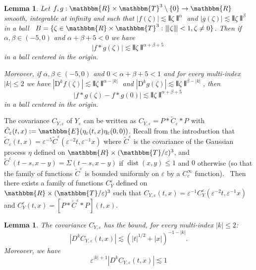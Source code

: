 \documentclass[a4paper,11pt]{article}
\newcommand{\assign}{:=}
\newcommand{\mathD}{\mathrm{D}}
\newcommand{\tmop}[1]{\ensuremath{\operatorname{#1}}}
\newtheorem{lemma}[theorem]{Lemma}
{\theorembodyfont{\rmfamily}\newtheorem{remark}[theorem]{Remark}}
\begin{document}
\begin{lemma}
  \label{l:hom-conv}Let $f, g : \mathbbm{R} \times \mathbbm{T}^3 \setminus
  \{0\} \rightarrow \mathbbm{R}$ smooth, integrable at infinity and such that
  $|f (\zeta) | \lesssim \interleave \zeta \interleave^{\alpha}$ and $|g
  (\zeta) | \lesssim \interleave \zeta \interleave^{\beta}$ in a ball \ $B =
  \{\zeta \in \mathbbm{R} \times \mathbbm{T}^3 : \interleave \zeta \interleave
  < 1, \zeta \neq 0\}$. Then if $\alpha, \beta \in (- 5, 0)$ and $\alpha +
  \beta + 5 < 0$ we have
  \[ |f \ast g (\zeta) | \lesssim \interleave \zeta \interleave^{\alpha +
     \beta + 5} \]
  in a ball centered in the origin.
  
  Moreover, if $\alpha, \beta \in (- 5, 0)$ and $0 < \alpha + \beta + 5 < 1$
  and for every multi-index $| k | \leqslant 2$ we have $| \mathD^k f (\zeta)
  | \lesssim \interleave \zeta \interleave^{\alpha - | k |}$ and $| \mathD^k g
  (\zeta) | \lesssim \interleave \zeta \interleave^{\beta - | k |}$, then
  \[ |f \ast g (\zeta) - f \ast g (0) | \lesssim \interleave \zeta
     \interleave^{\alpha + \beta + 5} \]
  in a ball centered in the origin.
\end{lemma}

\begin{remark}
  \label{r:rescaling-properties-cov}The covariance $C_{Y, \varepsilon}$ of
  $Y_{\varepsilon}$ can be written as $C_{Y, \varepsilon} = P \ast
  \tilde{C}_{\varepsilon} \ast P_{}$ with $\tilde{C}_{\varepsilon} (t, x)
  \assign \mathbbm{E} (\eta_{\varepsilon} (t, x) \eta_{\varepsilon} (0, 0))$.
  Recall from the introduction that $\tilde{C}_{\varepsilon} (t, x) =
  \varepsilon^{- 5} \tilde{C}^{\varepsilon} (\varepsilon^{- 2} t,
  \varepsilon^{- 1} x)$ where $\tilde{C}^{\varepsilon}$ is the covariance of
  the Gaussian process $\eta$ defined on $\mathbbm{R} \times (\mathbbm{T}/
  \varepsilon)^3$, and $\tilde{C}^{\varepsilon} (t - s, x - y) = \Sigma (t -
  s, x - y)$ if $\tmop{dist} (x, y) \leqslant 1$ and $0$ otherwise (so that
  the family of functions $\tilde{C}^{\varepsilon}$ is bounded uniformly on
  $\varepsilon$ by a $C^{\infty}_c$ function). \ Then there exists a family of
  functions $C_Y^{\varepsilon}$ defined on $\mathbbm{R} \times (\mathbbm{T}/
  \varepsilon)^3$ such that $C_{Y, \varepsilon} (t, x) = \varepsilon^{- 1}
  C_Y^{\varepsilon} (\varepsilon^{- 2} t, \varepsilon^{- 1} x)$ and
  $C_Y^{\varepsilon} (t, x) = [P \ast \tilde{C}^{\varepsilon} \ast P_{}] (t,
  x)$.
\end{remark}

\begin{lemma}
  \label{l:cov-est-eps}The covariance $C_{Y, \varepsilon}$
  \label{l:cov-est-tx}has the bound, for every multi-index $| k | \leqslant
  2$:
  \[ | D^k C_{Y, \varepsilon} (t, x) | \lesssim (| t |^{1 / 2} + | x |)^{- 1 -
     | k |} . \]
  Moreover, we have
  \[ \varepsilon^{| k |_{} + 1} | D^k C_{Y, \varepsilon} (t, x) | \lesssim 1
  \]
\end{lemma}
\end{document}
